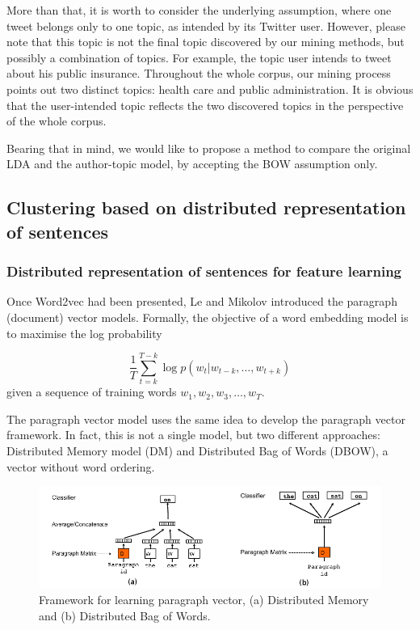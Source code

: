 \documentclass[11pt]{article}
\begin{document}
More than that, it is worth to consider the underlying assumption, where one tweet belongs only to one topic, as intended by its Twitter user. However, please note that this topic is not the final topic discovered by our mining methods, but possibly a combination of topics. For example, the topic user intends to tweet about his public insurance. Throughout the whole corpus, our mining process points out two distinct topics: health care and public administration. It is obvious that the user-intended topic reflects the two discovered topics in the perspective of the whole corpus.

Bearing that in mind, we would like to propose a method to compare the original LDA and the author-topic model, by accepting the BOW assumption only.

\subsection{Clustering based on distributed representation of sentences} \label{doc2vec}

\subsubsection{Distributed representation of sentences for feature learning}

Once Word2vec\cite{mikolov2013distributed} had been presented, Le and Mikolov introduced the paragraph (document) vector models. Formally, the objective of a word embedding model is to maximise the log probability

\[\frac{1}{T}\sum_{t=k}^{T-k}\log p(w_t|w_{t-k},\dots,w_{t+k}) \]
given a sequence of training words $w_1,w_2,w_3,\dots,w_T$.


The paragraph vector model uses the same idea to develop the paragraph vector framework. In fact, this is not a single model, but two different approaches: Distributed Memory model (DM) and Distributed Bag of Words (DBOW), a vector without word ordering.

\begin{figure}[ht]
	\centering
	\includegraphics[width=\textwidth]{doc2vec}
	\caption{Framework for learning paragraph vector, (a) Distributed Memory and (b) Distributed Bag of Words.}
	\label{fig:doc2vec}
\end{figure}
\end{document}
